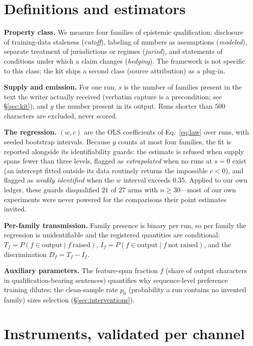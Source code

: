 \documentclass[11pt]{article}
\newcommand{\ww}{\ensuremath{w}}
\newcommand{\cc}{\ensuremath{c}}
\begin{document}
\section{Definitions and estimators}
\label{sec:defs}

\textbf{Property class.} We measure four families of epistemic
qualification: disclosure of training-data staleness (\emph{cutoff}),
labeling of numbers as assumptions (\emph{modeled}), separate treatment of
jurisdictions or regimes (\emph{jurisd}), and statements of conditions under
which a claim changes (\emph{hedging}). The framework is not specific to
this class; the kit ships a second class (source attribution) as a plug-in.

\textbf{Supply and emission.} For one run, $s$ is the number of families
present in the text the writer actually received (verbatim capture is a
precondition; see \S\ref{sec:kit}), and $y$ the number present in its
output. Runs shorter than $500$ characters are excluded, never scored.

\textbf{The regression.} $(\ww,\cc)$ are the OLS coefficients of
Eq.~\ref{eq:law} over runs, with seeded bootstrap intervals. Because $y$
counts at most four families, the fit is reported alongside its
identifiability guards: the estimate is refused when supply spans fewer than
three levels, flagged as \emph{extrapolated} when no runs at $s{=}0$ exist
(an intercept fitted outside its data routinely returns the impossible
$\cc<0$), and flagged as \emph{weakly identified} when the \ww{} interval
exceeds $0.35$. Applied to our own ledger, these guards disqualified $21$ of
$27$ arms with $n\geq30$---most of our own experiments were never powered
for the comparisons their point estimates invited.

\textbf{Per-family transmission.} Family presence is binary per run, so
per family the regression is unidentifiable and the registered quantities
are conditional: $T_f = P(f \in \text{output} \mid f\ \text{raised})$,
$I_f = P(f \in \text{output} \mid f\ \text{not raised})$, and the
discrimination $D_f = T_f - I_f$.

\textbf{Auxiliary parameters.} The feature-span fraction $f$ (share of
output characters in qualification-bearing sentences) quantifies why
sequence-level preference training dilutes; the clean-sample rate $p_0$
(probability a run contains no invented family) sizes selection
(\S\ref{sec:interventions}).

\section{Instruments, validated per channel}
\label{sec:instruments}
\end{document}
